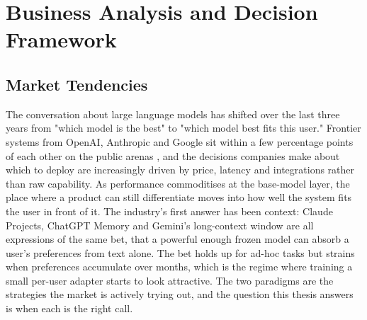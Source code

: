 %

\section{Business Analysis and Decision Framework}
\label{sec:business}

\subsection{Market Tendencies}
\label{sec:business:tendencies}

The conversation about large language models has shifted over the last three years from "which model is the best" to "which model best fits this user." Frontier systems from OpenAI, Anthropic and Google sit within a few percentage points of each other on the public arenas \citep{chiang2024arena}, and the decisions companies make about which to deploy are increasingly driven by price, latency and integrations rather than raw capability. As performance commoditises at the base-model layer, the place where a product can still differentiate moves into how well the system fits the user in front of it. The industry's first answer has been context: Claude Projects, ChatGPT Memory and Gemini's long-context window \citep{reid2024gemini} are all expressions of the same bet, that a powerful enough frozen model can absorb a user's preferences from text alone. The bet holds up for ad-hoc tasks but strains when preferences accumulate over months, which is the regime where training a small per-user adapter starts to look attractive. The two paradigms are the strategies the market is actively trying out, and the question this thesis answers is when each is the right call.

